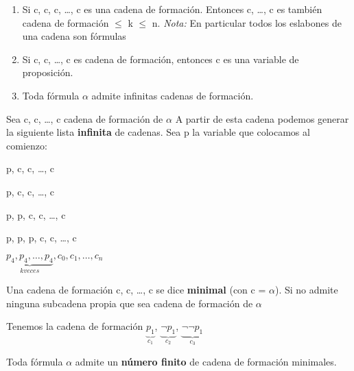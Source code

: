 \begin{observation}
$\;$
\begin{enumerate}
	\item Si c, c, c, \ldots, c es una cadena de formaci\'on. Entonces c, \ldots, c es tambi\'en cadena de formaci\'on  $\leq$ k $\leq$ n. \emph{Nota:} En particular todos los eslabones de una cadena son f\'ormulas
	\item Si c, c, \ldots, c es cadena de formaci\'on, entonces c es una variable de proposici\'on.
	\item Toda f\'ormula $\alpha$ admite infinitas cadenas de formaci\'on.
\end{enumerate}

Sea c, c, \ldots, c cadena de formaci\'on de $\alpha$ A partir de esta cadena podemos generar la siguiente lista \textbf{infinita} de cadenas. Sea p la variable que colocamos al comienzo:

p, c, c, \ldots, c

p, c, c, \ldots, c

p, p, c, c, \ldots, c

p, p, p, c, c, \ldots, c

$\underbrace{p_4, p_4, \ldots, p_4}_{k veces}, c_0, c_1, \ldots, c_n$

\end{observation}

\begin{definition}

Una cadena de formaci\'on c, c, \ldots, c se dice \textbf{minimal} (con c = $\alpha$). Si no admite ninguna subcadena propia que sea cadena de formaci\'on de $\alpha$

\end{definition}

\begin{example}

Tenemos la cadena de formaci\'on $\underbrace{p_1}_{c_1}$, $\underbrace{\neg p_1}_{c_2}$, $\underbrace{\neg \neg p_1}_{c_3}$

\end{example}

\begin{proposition}

Toda f\'ormula $\alpha$ admite un \textbf{n\'umero finito} de cadena de formaci\'on minimales.

\end{proposition}

